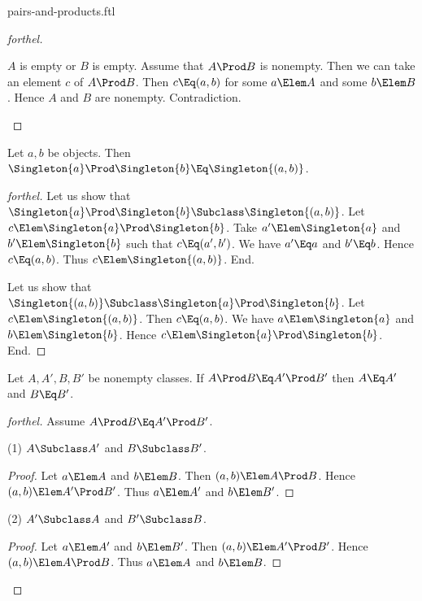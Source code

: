 \documentclass{stex}
\begin{document}
\begin{smodule}{pairs-and-products.ftl}
\begin{proof}[forthel]
  \begin{case}{$A$ is empty or $B$ is empty.}
    Assume that $A \Prod B$ is nonempty.
    Then we can take an element $c$ of $A \Prod B$.
    Then $c \Eq (a, b)$ for some $a \Elem A$ and some $b \Elem B$.
    Hence $A$ and $B$ are nonempty.
    Contradiction.
  \end{case}
\end{proof}

\begin{proposition*}[forthel]
  Let $a, b$ be objects.
  Then $\Singleton{a} \Prod \Singleton{b} \Eq \Singleton{(a, b)}$.
\end{proposition*}
\begin{proof}[forthel]
  Let us show that $\Singleton{a} \Prod \Singleton{b} \Subclass \Singleton{(a, b)}$.
    Let $c \Elem \Singleton{a} \Prod \Singleton{b}$.
    Take $a' \Elem \Singleton{a}$ and $b' \Elem \Singleton{b}$ such that $c \Eq (a', b')$.
    We have $a' \Eq a$ and $b' \Eq b$.
    Hence $c \Eq (a, b)$.
    Thus $c \Elem \Singleton{(a, b)}$.
  End.

  Let us show that $\Singleton{(a, b)} \Subclass \Singleton{a} \Prod \Singleton{b}$.
    Let $c \Elem \Singleton{(a, b)}$.
    Then $c \Eq (a, b)$.
    We have $a \Elem \Singleton{a}$ and $b \Elem \Singleton{b}$.
    Hence $c \Elem \Singleton{a} \Prod \Singleton{b}$.
  End.
\end{proof}

\begin{proposition*}[forthel]
  Let $A, A', B, B'$ be nonempty classes.
  If $A \Prod B \Eq A' \Prod B'$ then $A \Eq A'$ and $B \Eq B'$.
\end{proposition*}
\begin{proof}[forthel]
  Assume $A \Prod B \Eq A' \Prod B'$.

  (1) $A \Subclass A'$ and $B \Subclass B'$.
  \begin{proof}
    Let $a \Elem A$ and $b \Elem B$.
    Then $(a,b) \Elem A \Prod B$.
    Hence $(a,b) \Elem A' \Prod B'$.
    Thus $a \Elem A'$ and $b \Elem B'$.
  \end{proof}

  (2) $A' \Subclass A$ and $B' \Subclass B$.
  \begin{proof}
    Let $a \Elem A'$ and $b \Elem B'$.
    Then $(a,b) \Elem A' \Prod B'$.
    Hence $(a,b) \Elem A \Prod B$.
    Thus $a \Elem A$ and $b \Elem B$.
  \end{proof}
\end{proof}

\end{smodule}
\end{document}
